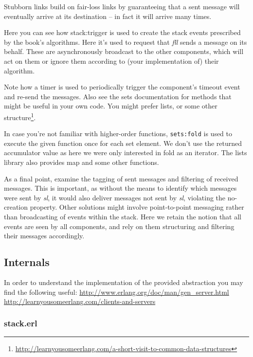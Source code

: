\documentclass[a4paper]{article}
\begin{document}
Stubborn links build on fair-loss links by guaranteeing that a sent message
will eventually arrive at its destination – in fact it will arrive many times.

Here you can see how stack:trigger is used to create the stack events
prescribed by the book's algorithms. Here it's used to request that \emph{fll} sends
a message on its behalf. These are asynchronously broadcast to the other components,
which will act on them or ignore them according to (your implementation of)
their algorithm.

Note how a timer is used to periodically trigger the component's timeout event
and re-send the messages. Also see the sets documentation for methods that
might be useful in your own code. You might prefer lists, or some other
structure\footnote{\url{http://learnyousomeerlang.com/a-short-visit-to-common-data-structures}}.

In case you're not familiar with higher-order functions, \lstinline!sets:fold!
is used to execute the given function once for each set element. We don't use
the returned accumulator value as here we were only interested in fold as an
iterator. The lists library also provides map and some other functions.

As a final point, examine the tagging of sent messages and filtering of
received messages. This is important, as without the means to identify which
messages were sent by \emph{sl}, it would also deliver messages not sent by \emph{sl},
violating the no-creation property. Other solutions might involve
point-to-point messaging rather than broadcasting of events within the stack.
Here we retain the notion that all events are seen by all components, and
rely on them structuring and filtering their messages accordingly.





\subsection{Internals} %
\label{sub:internals}

In order to understand the implementation of the provided abstraction you
may find the following useful:
\url{http://www.erlang.org/doc/man/gen_server.html}\\
\url{http://learnyousomeerlang.com/clients-and-servers}

\subsubsection{stack.erl} %
\label{sub:stack_erl}
\end{document}
